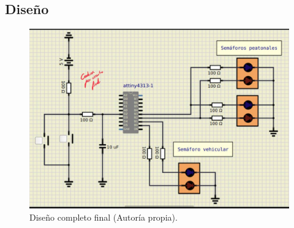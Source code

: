 \subsection{Diseño}




\begin{figure}[H]
\centering
\includegraphics[scale=0.3]{./images/index.jpeg}
\caption{Diseño completo final (Autoría propia).}
\label{f1}
\end{figure}
